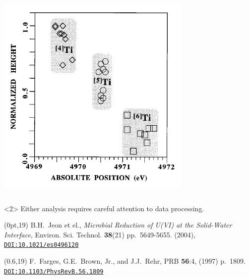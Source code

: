 \documentclass[10pt, xcolor=x11names, compress]{beamer}
\begin{document}
\begin{frame}
\begin{columns}[T]
\begin{column}{0.5\linewidth}
      \includegraphics[width=0.8\linewidth]{../selfabs/images/farges.png}      
    \end{column}
  \end{columns}
  \begin{exampleblock}<2>{}
    \small%
    \qquad Either analysis requires careful attention to data processing.
  \end{exampleblock}
  \begin{textblock*}{0.5\linewidth}(0pt,19\TPVertModule)%
    \tiny%
    B.H.\ Jeon et el., \textit{Microbial Reduction of U(VI) at the
      Solid-Water Interface}, Environ. Sci. Technol. \textbf{38}(21)
    pp.~5649-5655. (2004), \href{http://dx.doi.org/10.1021/es0496120}
    {\color{Blue4}\texttt{DOI:10.1021/es0496120}}
  \end{textblock*}
  \begin{textblock*}{0.4\linewidth}(0.6\linewidth,19\TPVertModule)
    \tiny%
    F.~Farges, G.E.~Brown, Jr., and J.J.~Rehr, PRB \textbf{56}:4,
    (1997) p.\ 1809.
    \href{http://dx.doi.org/10.1103/PhysRevB.56.1809}
    {\color{Blue4}\texttt{DOI:10.1103/PhysRevB.56.1809}}
  \end{textblock*}

\end{frame}
\end{document}
